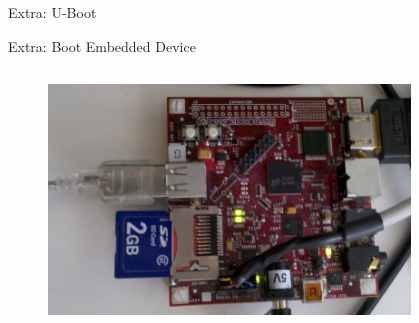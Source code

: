 \documentclass{workshop}
\begin{document}
\begin{frame}{Extra: U-Boot}
\end{frame}

\begin{frame}{Extra: Boot Embedded Device}
  \begin{columns}
    \begin{column}[l]{0.45\textwidth}
      \begin{figure}
         \includegraphics[scale=0.17]{img/beagle.jpg}
      \end{figure}
    \end{column}
    \begin{column}[l]{0.45\textwidth}
      \begin{figure}

\end{figure}
\end{column}
\end{columns}
\end{frame}
\end{document}
